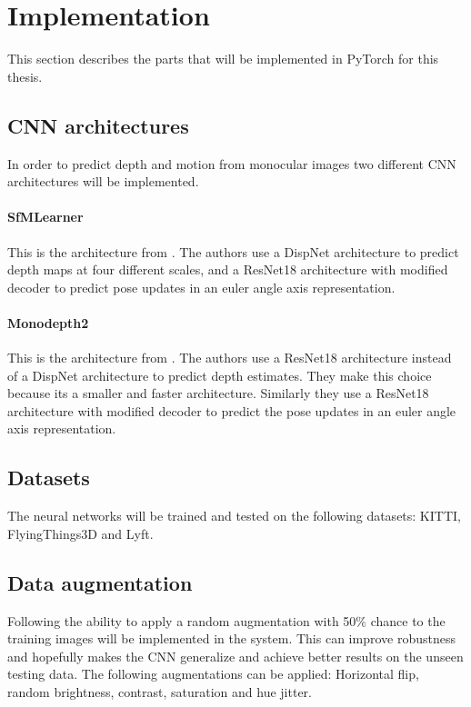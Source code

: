 \section{Implementation}

This section describes the parts that will be implemented in PyTorch for this thesis.

\subsection{CNN architectures}

In order to predict depth and motion from monocular images two different CNN architectures will be implemented.

\paragraph{SfMLearner} This is the architecture from \cite{sfmlearner}. The authors use a DispNet\cite{dispnet} architecture to predict depth maps at four different scales, and a ResNet18\cite{resnet} architecture with modified decoder to predict pose updates in an euler angle axis representation.

\paragraph{Monodepth2} This is the architecture from \cite{monodepth2}. The authors use a ResNet18 architecture instead of a DispNet architecture to predict depth estimates. They make this choice because its a smaller and faster architecture. Similarly they use a ResNet18 architecture with modified decoder to predict the pose updates in an euler angle axis representation.



\subsection{Datasets}

The neural networks will be trained and tested on the following datasets: KITTI\cite{kitti}, FlyingThings3D\cite{dispnet} and Lyft\cite{lyft2019}.

\subsection{Data augmentation}

Following \cite{monodepth2} the ability to apply a random augmentation with 50\% chance to the training images will be implemented in the system. This can improve robustness and hopefully makes the CNN generalize and achieve better results on the unseen testing data. The following augmentations can be applied: Horizontal flip, random brightness, contrast, saturation and hue jitter.

